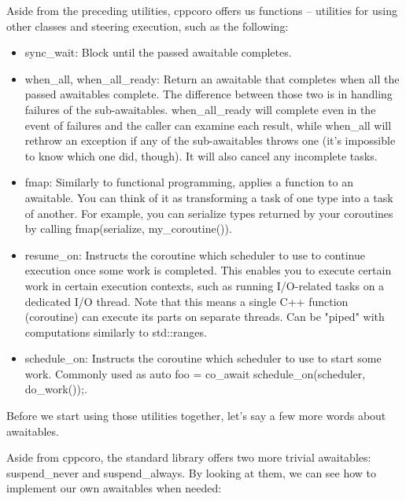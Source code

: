 Aside from the preceding utilities, cppcoro offers us functions – utilities for using other classes and steering execution, such as the following:

\begin{itemize}
\item 
sync\_wait: Block until the passed awaitable completes.

\item
when\_all, when\_all\_ready: Return an awaitable that completes when all the passed awaitables complete. The difference between those two is in handling failures of the sub-awaitables. when\_all\_ready will complete even in the event of failures and the caller can examine each result, while when\_all will rethrow an exception if any of the sub-awaitables throws one (it's impossible to know which one did, though). It will also cancel any incomplete tasks.

\item
fmap: Similarly to functional programming, applies a function to an awaitable. You can think of it as transforming a task of one type into a task of another. For example, you can serialize types returned by your coroutines by calling fmap(serialize, my\_coroutine()).

\item
resume\_on: Instructs the coroutine which scheduler to use to continue execution once some work is completed. This enables you to execute certain work in certain execution contexts, such as running I/O-related tasks on a dedicated I/O thread. Note that this means a single C++ function (coroutine) can execute its parts on separate threads. Can be "piped" with computations similarly to std::ranges.

\item
schedule\_on: Instructs the coroutine which scheduler to use to start some work. Commonly used as auto foo = co\_await schedule\_on(scheduler,
do\_work());.
\end{itemize}

Before we start using those utilities together, let's say a few more words about awaitables.


Aside from cppcoro, the standard library offers two more trivial awaitables: suspend\_never and suspend\_always. By looking at them, we can see how to implement our own awaitables when needed:

